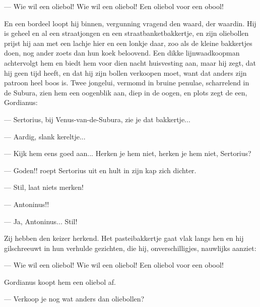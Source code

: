 \documentclass[a4paper, 12pt, oneside, dutch]{article}
\begin{document}
--- Wie wil een oliebol! Wie wil een oliebol! Een oliebol voor een obool!

En een bordeel loopt hij binnen, vergunning vragend den waard, der waardin. Hij is geheel en al een straatjongen en een straatbanketbakkertje, en zijn oliebollen prijst hij aan met een lachje hier en een lonkje daar, zoo als de kleine bakkertjes doen, nog ander zoets dan hun koek beloovend. Een dikke lijnwaadkoopman achtervolgt hem en biedt hem voor dien nacht huisvesting aan, maar hij zegt, dat hij geen tijd heeft, en dat hij zijn bollen verkoopen moet, want dat anders zijn patroon heel boos is. Twee jongelui, vermomd in bruine penulae, scharrelend in de Subura, zien hem een oogenblik aan, diep in de oogen, en plots zegt de een, Gordianus:

--- Sertorius, bij Venus-van-de-Subura, zie je dat bakkertje...

--- Aardig, slank kereltje...

--- Kijk hem eens goed aan... Herken je hem niet, herken je hem niet, Sertorius?

--- Goden!! roept Sertorius uit en hult in zijn kap zich dichter.

--- Stil, laat niets merken!

--- Antoninus!!

--- Ja, Antoninus... Stil!

Zij hebben den keizer herkend. Het pasteibakkertje gaat vlak langs hen en hij gilschreeuwt in hun verhulde gezichten, die hij, onverschilligjes, nauwlijks aanziet:

--- Wie wil een oliebol! Wie wil een oliebol! Een oliebol voor een obool!

Gordianus koopt hem een oliebol af.

--- Verkoop je nog wat anders dan oliebollen?
\end{document}
